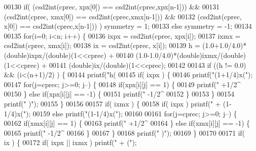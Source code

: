 \begin{DoxyCode}
{{{{{{{{{{{00130     \textcolor{keywordflow}{if}( (csd2int(cprec, xpx[0]) == csd2int(cprec,xpx[n-1])) &&
00131         (csd2int(cprec, xmx[0]) == csd2int(cprec,xmx[n-1])) &&
00132         (csd2int(cprec,   x[0]) == csd2int(cprec,x[n-1])) ) symmetry = 1;
00133     \textcolor{keywordflow}{else} symmetry = -1;
00134 
00135     \textcolor{keywordflow}{for}(i=0; i<n; i++) \{
00136         ixpx = csd2int(cprec, xpx[i]);
00137         ixmx = csd2int(cprec, xmx[i]);
00138         ix   = csd2int(cprec, x[i]);
00139         h =     (1.0+1.0/4.0)*(double)ixpx/(\textcolor{keywordtype}{double})(1<<cprec) +
00140             (1.0-1.0/4.0)*(double)ixmx/(\textcolor{keywordtype}{double})(1<<cprec) + 
00141             (\textcolor{keywordtype}{double})ix/(double)(1<<cprec);
00142 
00143         \textcolor{keywordflow}{if} ((h != 0.0) && (i<(n+1)/2) ) \{
00144             printf(\textcolor{stringliteral}{"h(%
00145             \textcolor{keywordflow}{if}( ixpx ) \{
00146                 printf(\textcolor{stringliteral}{"(1+1/4)x("});
00147                 \textcolor{keywordflow}{for}(j=cprec; j>=0; j--) \{
00148                     \textcolor{keywordflow}{if}(xpx[i][j] == 1) \{
00149                         printf(\textcolor{stringliteral}{" +1/2^%
00150                     \} \textcolor{keywordflow}{else} \textcolor{keywordflow}{if}(xpx[i][j] == -1) \{
00151                         printf(\textcolor{stringliteral}{" -1/2^%
00152                     \}
00153                 \}
00154                 printf(\textcolor{stringliteral}{" )"});
00155             \}
00156 
00157             \textcolor{keywordflow}{if}( ixmx ) \{
00158                 \textcolor{keywordflow}{if}( ixpx ) printf(\textcolor{stringliteral}{" + (1-1/4)x("});
00159                 \textcolor{keywordflow}{else} printf(\textcolor{stringliteral}{"(1-1/4)x("});
00160 
00161                 \textcolor{keywordflow}{for}(j=cprec; j>=0; j--) \{
00162                     \textcolor{keywordflow}{if}(xmx[i][j] == 1) \{
00163                         printf(\textcolor{stringliteral}{" +1/2^%
00164                     \} \textcolor{keywordflow}{else} \textcolor{keywordflow}{if}(xmx[i][j] == -1) \{
00165                         printf(\textcolor{stringliteral}{" -1/2^%
00166                     \}
00167                 \}
00168                 printf(\textcolor{stringliteral}{" )"});
00169             \}
00170 
00171             \textcolor{keywordflow}{if}( ix ) \{
00172                 \textcolor{keywordflow}{if}( ixpx || ixmx ) printf(\textcolor{stringliteral}{" + ("});
}}}}}}}}}}}}}}}}
\end{DoxyCode}
